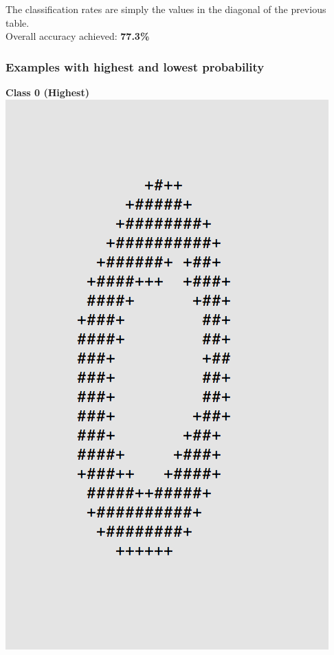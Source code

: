 \documentclass[11pt]{article}
\begin{document}
The classification rates are simply the values in the diagonal of the previous table.\\
Overall accuracy achieved: \textbf{77.3\%}

\pagebreak
\subsubsection*{Examples with highest and lowest probability}
\begin{center}
\begin{multicols}{2}
\textbf{Class 0 (Highest)}\\
\includegraphics[scale=0.4]{part1/1/high_0.png}


\end{multicols}
\end{center}
\end{document}
